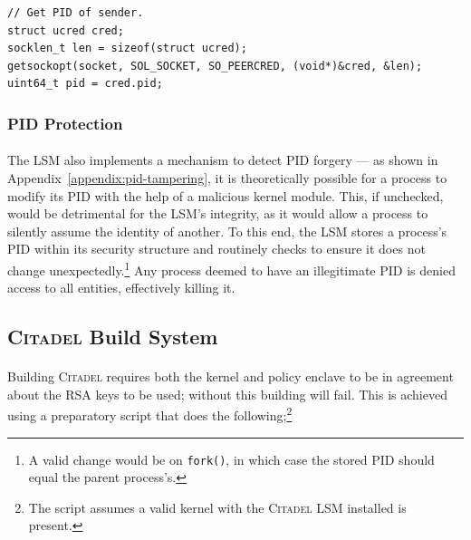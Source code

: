 \begin{verbatim}
// Get PID of sender.
struct ucred cred;
socklen_t len = sizeof(struct ucred);
getsockopt(socket, SOL_SOCKET, SO_PEERCRED, (void*)&cred, &len);
uint64_t pid = cred.pid;
\end{verbatim}

\subsubsection{PID Protection}
\paragraph{} The LSM also implements a mechanism to detect PID forgery --- as shown in Appendix~\ref{appendix:pid-tampering}, it is theoretically possible for a process to modify its PID with the help of a malicious kernel module. This, if unchecked, would be detrimental for the LSM's integrity, as it would allow a process to silently assume the identity of another. To this end, the LSM stores a process's PID within its security structure and routinely checks to ensure it does not change unexpectedly.\footnote{A valid change would be on \texttt{fork()}, in which case the stored PID should equal the parent process's.} Any process deemed to have an illegitimate PID is denied access to all entities, effectively killing it.

\subsection{\textsc{Citadel} Build System}
\label{sec:build-system}
\paragraph{} Building \textsc{Citadel} requires both the kernel and policy enclave to be in agreement about the RSA keys to be used; without this building will fail. This is achieved using a preparatory script that does the following;\footnote{The script assumes a valid kernel with the \textsc{Citadel} LSM installed is present.}

